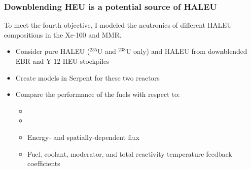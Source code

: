 \begin{frame}
    \frametitle{Downblending HEU is a potential source of HALEU}
    To meet the fourth objective, I modeled the neutronics of 
    different HALEU compositions in the Xe-100 and MMR.
    \begin{itemize}
        \item Consider pure HALEU ($^{235}$U and $^{238}$U only)
              and HALEU from downblended \gls{EBR} 
              \cite{vaden_isotopic_2018} and Y-12 
              \cite{nelson_foreign_2010}  \gls{HEU} stockpiles
        \item Create models in Serpent \cite{leppanen_serpent_2013} 
              for these two reactors
        \item Compare the performance of the fuels with respect to:
        \begin{itemize}
            \item \keff
            \item \betaEff
            \item Energy- and spatially-dependent flux
            \item Fuel, coolant, moderator, and total reactivity
                  temperature feedback coefficients
        \end{itemize}
    \end{itemize}

\end{frame}

